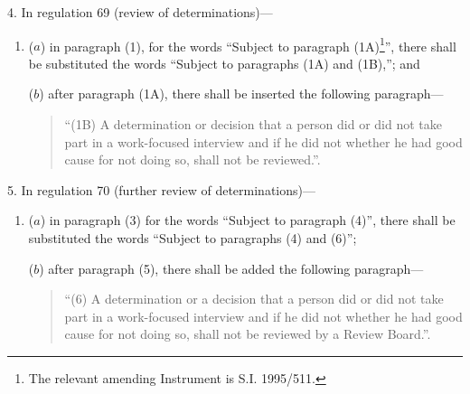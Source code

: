 \documentclass[12pt,a4paper]{article}
\begin{document}
\medskip

4.  In regulation 69 (review of determinations)—
\begin{enumerate}\item[]
($a$) in paragraph (1), for the words “Subject to paragraph (1A)\footnote{\frenchspacing The relevant amending Instrument is S.I. 1995/511.}”, there shall be substituted the words “Subject to paragraphs (1A) and (1B),”; and

\goodbreak[3]

($b$) after paragraph (1A), there shall be inserted the following paragraph—
\begin{quotation}
“(1B) A determination or decision that a person did or did not take part in a work-focused interview and if he did not whether he had good cause for not doing so, shall not be reviewed.”.
\end{quotation}
\end{enumerate}

\medskip

5.  In regulation 70 (further review of determinations)—
\begin{enumerate}\item[]
($a$) in paragraph (3) for the words “Subject to paragraph (4)”, there shall be substituted the words “Subject to paragraphs (4) and (6)”;

($b$) after paragraph (5), there shall be added the following paragraph—
\begin{quotation}
“(6) A determination or a decision that a person did or did not take part in a work-focused interview and if he did not whether he had good cause for not doing so, shall not be reviewed by a Review Board.”.
\end{quotation}
\end{enumerate}

\medskip
\end{document}
